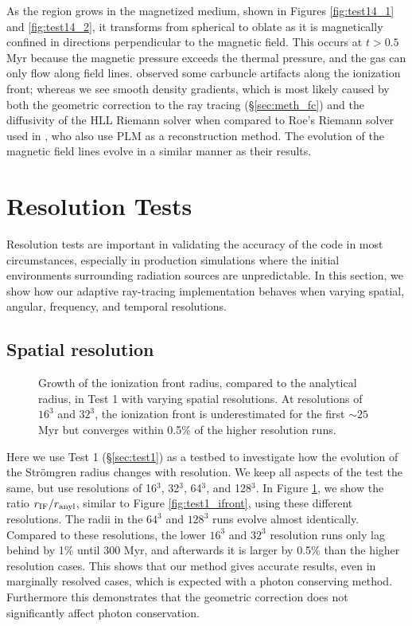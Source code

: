\documentclass[useAMS,usenatbib,a4paper]{mn2e}
\begin{document}
As the \hii region grows in the magnetized medium, shown in
Figures \ref{fig:test14_1} and \ref{fig:test14_2}, it transforms from
spherical to oblate as it is magnetically confined in directions
perpendicular to the magnetic field.  This occurs at $t > 0.5$ Myr
because the magnetic pressure exceeds the thermal pressure, and the
gas can only flow along field lines.  \citeauthor{Krumholz07_ART}
observed some carbuncle artifacts along the ionization front; whereas
we see smooth density gradients, which is most likely caused by both
the geometric correction to the ray tracing (\S\ref{sec:meth_fc}) and
the diffusivity of the HLL Riemann solver when compared to Roe's
Riemann solver used in \citet{Krumholz07_ART}, who also use PLM as a
reconstruction method.  The evolution of the magnetic field lines
evolve in a similar manner as their results.

\section{Resolution Tests}

Resolution tests are important in validating the accuracy of the code
in most circumstances, especially in production simulations where the
initial environments surrounding radiation sources are unpredictable.
In this section, we show how our adaptive ray-tracing implementation
behaves when varying spatial, angular, frequency, and temporal
resolutions.

\subsection{Spatial resolution}
\label{sec:dx_dep}

\begin{figure}
  \caption{\label{fig:dx_dep1} Growth of the ionization front radius,
    compared to the analytical radius, in Test 1 with varying spatial
    resolutions.  At resolutions of $16^3$ and $32^3$, the ionization
    front is underestimated for the first $\sim25$ Myr but converges
    within 0.5\% of the higher resolution runs.}
\end{figure}

Here we use Test 1 (\S\ref{sec:test1}) as a testbed to investigate how
the evolution of the Str\"{o}mgren radius changes with resolution.  We
keep all aspects of the test the same, but use resolutions of 16$^3$,
32$^3$, 64$^3$, and 128$^3$.  In Figure \ref{fig:dx_dep1}, we show the
ratio $r_{\rm IF}/r_{\rm anyl}$, similar to Figure
\ref{fig:test1_ifront}, using these different resolutions.  The radii
in the $64^3$ and $128^3$ runs evolve almost identically.  Compared to
these resolutions, the lower $16^3$ and $32^3$ resolution runs only
lag behind by 1\% until 300 Myr, and afterwards it is larger by 0.5\%
than the higher resolution cases.  This shows that our method gives
accurate results, even in marginally resolved cases, which is expected
with a photon conserving method.  Furthermore this demonstrates that
the geometric correction does not significantly affect photon
conservation.
\end{document}
